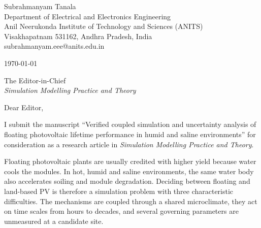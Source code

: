 \documentclass[11pt]{article}
\begin{document}
Subrahmanyam Tanala\\
Department of Electrical and Electronics Engineering\\
Anil Neerukonda Institute of Technology and Sciences (ANITS)\\
Visakhapatnam 531162, Andhra Pradesh, India\\
subrahmanyam.eee@anits.edu.in

\today

The Editor-in-Chief\\
\emph{Simulation Modelling Practice and Theory}

Dear Editor,

I submit the manuscript ``Verified coupled simulation and uncertainty analysis of floating photovoltaic lifetime
performance in humid and saline environments'' for consideration as a research article in \emph{Simulation Modelling
Practice and Theory}.

Floating photovoltaic plants are usually credited with higher yield because water cools the modules. In hot, humid and
saline environments, the same water body also accelerates soiling and module degradation. Deciding between floating and
land-based PV is therefore a simulation problem with three characteristic difficulties. The mechanisms are coupled
through a shared microclimate, they act on time scales from hours to decades, and several governing parameters are
unmeasured at a candidate site.
\end{document}
